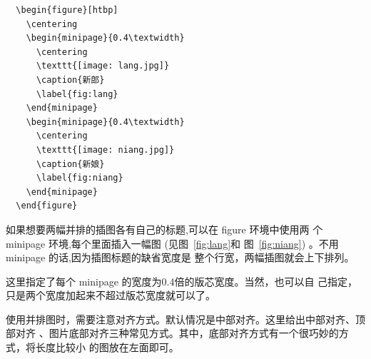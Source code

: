 \begin{lstlisting}
  \begin{figure}[htbp]
    \centering
    \begin{minipage}{0.4\textwidth}
      \centering
      \texttt{[image: lang.jpg]}
      \caption{新郎}
      \label{fig:lang}
    \end{minipage}
    \begin{minipage}{0.4\textwidth}
      \centering
      \texttt{[image: niang.jpg]}
      \caption{新娘}
      \label{fig:niang}
    \end{minipage}
  \end{figure}
\end{lstlisting}

如果想要两幅并排的插图各有自己的标题,可以在 figure 环境中使用两
个 minipage 环境,每个里面插入一幅图 (见图~\ref{fig:lang}和
图~\ref{fig:niang}) 。不用 minipage 的话,因为插图标题的缺省宽度是
整个行宽，两幅插图就会上下排列。

这里指定了每个 minipage 的宽度为0.4倍的版芯宽度。当然，也可以自
己指定，只是两个宽度加起来不超过版芯宽度就可以了。

使用并排图时，需要注意对齐方式。默认情况是中部对齐。这里给出中部对齐、顶部对齐
、图片底部对齐三种常见方式。其中，底部对齐方式有一个很巧妙的方式，将长度比较小
的图放在左面即可。

